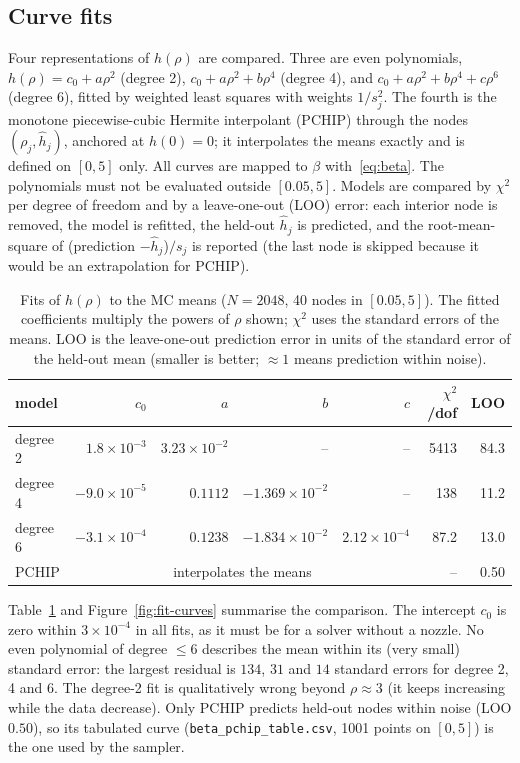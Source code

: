 \subsection{Curve fits}
Four representations of $h(\rho)$ are compared. Three are even polynomials, $h(\rho)=c_0+a\rho^2$ (degree 2), $c_0+a\rho^2+b\rho^4$ (degree 4), and $c_0+a\rho^2+b\rho^4+c\rho^6$ (degree 6), fitted by weighted least squares with weights $1/s_j^2$. The fourth is the monotone piecewise-cubic Hermite interpolant (PCHIP) through the nodes $(\rho_j,\hat h_j)$, anchored at $h(0)=0$; it interpolates the means exactly and is defined on $[0,5]$ only. All curves are mapped to $\beta$ with~\eqref{eq:beta}. The polynomials must not be evaluated outside $[0.05,5]$. Models are compared by $\chi^2$ per degree of freedom and by a leave-one-out (LOO) error: each interior node is removed, the model is refitted, the held-out $\hat h_j$ is predicted, and the root-mean-square of (prediction $-\hat h_j$)$/s_j$ is reported (the last node is skipped because it would be an extrapolation for PCHIP).

\begin{table}[t]
  \centering
  \caption{Fits of $h(\rho)$ to the MC means ($N=2048$, 40 nodes in $[0.05,5]$). The fitted coefficients multiply the powers of $\rho$ shown; $\chi^2$ uses the standard errors of the means. LOO is the leave-one-out prediction error in units of the standard error of the held-out mean (smaller is better; $\approx1$ means prediction within noise).}
  \label{tab:fits}
  \begin{tabular}{lrrrrrr}
    \toprule
    model & $c_0$ & $a$ & $b$ & $c$ & $\chi^2$/dof & LOO\\
    \midrule
    degree 2 & $1.8\times10^{-3}$ & $3.23\times10^{-2}$ & -- & -- & 5413 & 84.3\\
    degree 4 & $-9.0\times10^{-5}$ & $0.1112$ & $-1.369\times10^{-2}$ & -- & 138 & 11.2\\
    degree 6 & $-3.1\times10^{-4}$ & $0.1238$ & $-1.834\times10^{-2}$ & $2.12\times10^{-4}$ & 87.2 & 13.0\\
    PCHIP    & \multicolumn{4}{c}{interpolates the means} & -- & 0.50\\
    \bottomrule
  \end{tabular}
\end{table}

Table~\ref{tab:fits} and Figure~\ref{fig:fit-curves} summarise the comparison. The intercept $c_0$ is zero within $3\times10^{-4}$ in all fits, as it must be for a solver without a nozzle. No even polynomial of degree $\le6$ describes the mean within its (very small) standard error: the largest residual is $134$, $31$ and $14$ standard errors for degree 2, 4 and 6. The degree-2 fit is qualitatively wrong beyond $\rho\approx3$ (it keeps increasing while the data decrease). Only PCHIP predicts held-out nodes within noise (LOO $0.50$), so its tabulated curve (\texttt{beta\_pchip\_table.csv}, 1001 points on $[0,5]$) is the one used by the sampler.

